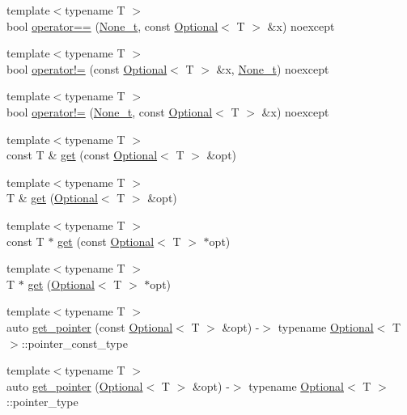 \begin{DoxyCompactItemize}
\item 
{\footnotesize template$<$typename T $>$ }\\bool \hyperlink{namespacemcurses_a0239af7ea07a44819bf660e8209d8d7a}{operator==} (\hyperlink{classmcurses_1_1None__t}{None\+\_\+t}, const \hyperlink{classmcurses_1_1Optional}{Optional}$<$ T $>$ \&x) noexcept
\item 
{\footnotesize template$<$typename T $>$ }\\bool \hyperlink{namespacemcurses_aef267a76cf338ec58e2b79a0691bf52c}{operator!=} (const \hyperlink{classmcurses_1_1Optional}{Optional}$<$ T $>$ \&x, \hyperlink{classmcurses_1_1None__t}{None\+\_\+t}) noexcept
\item 
{\footnotesize template$<$typename T $>$ }\\bool \hyperlink{namespacemcurses_a9de7df455336c7f75d83a33730a0afcc}{operator!=} (\hyperlink{classmcurses_1_1None__t}{None\+\_\+t}, const \hyperlink{classmcurses_1_1Optional}{Optional}$<$ T $>$ \&x) noexcept
\item 
{\footnotesize template$<$typename T $>$ }\\const T \& \hyperlink{namespacemcurses_aecfab040ad7ea9b1d5cf9ea4994431e0}{get} (const \hyperlink{classmcurses_1_1Optional}{Optional}$<$ T $>$ \&opt)
\item 
{\footnotesize template$<$typename T $>$ }\\T \& \hyperlink{namespacemcurses_a67fa46298482b4f9f0d4d9af2fc57737}{get} (\hyperlink{classmcurses_1_1Optional}{Optional}$<$ T $>$ \&opt)
\item 
{\footnotesize template$<$typename T $>$ }\\const T $\ast$ \hyperlink{namespacemcurses_ac518dd9b4c181ecb07ddfe3a76b810f6}{get} (const \hyperlink{classmcurses_1_1Optional}{Optional}$<$ T $>$ $\ast$opt)
\item 
{\footnotesize template$<$typename T $>$ }\\T $\ast$ \hyperlink{namespacemcurses_a2f17cb40b825113e523fd0c67bfc85c0}{get} (\hyperlink{classmcurses_1_1Optional}{Optional}$<$ T $>$ $\ast$opt)
\item 
{\footnotesize template$<$typename T $>$ }\\auto \hyperlink{namespacemcurses_a3a37e772efc81d6dc80e6b53ffa8c89c}{get\+\_\+pointer} (const \hyperlink{classmcurses_1_1Optional}{Optional}$<$ T $>$ \&opt) -\/$>$ typename \hyperlink{classmcurses_1_1Optional}{Optional}$<$ T $>$\+::pointer\+\_\+const\+\_\+type
\item 
{\footnotesize template$<$typename T $>$ }\\auto \hyperlink{namespacemcurses_a19b17f8de177c03a633c1b48fdf0a91c}{get\+\_\+pointer} (\hyperlink{classmcurses_1_1Optional}{Optional}$<$ T $>$ \&opt) -\/$>$ typename \hyperlink{classmcurses_1_1Optional}{Optional}$<$ T $>$\+::pointer\+\_\+type
\end{DoxyCompactItemize}
